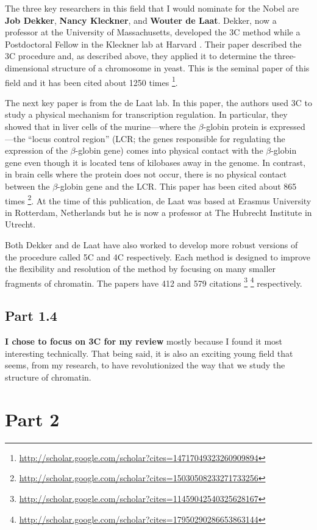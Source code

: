 \documentclass[12pt]{article}
\begin{document}
The three key researchers in this field that I would nominate for the Nobel
are {\bf Job Dekker}, {\bf Nancy Kleckner}, and {\bf Wouter de Laat}.
Dekker, now a professor at the University of Massachusetts, developed the 3C
method while a Postdoctoral Fellow in the Kleckner lab at Harvard \cite{ccc}.
Their paper \cite{ccc} described the 3C procedure and, as described above,
they applied it to determine the three-dimensional structure of a chromosome
in yeast.
This is the seminal paper of this field and it has been cited about 1250
times%
\footnote{\url{http://scholar.google.com/scholar?cites=14717049323260909894}}.

The next key paper \cite{looping} is from the de Laat lab.
In this paper, the authors used 3C to study a physical mechanism for
transcription regulation.
In particular, they showed that in liver cells of the murine---where the
$\beta$-globin protein is expressed---the ``locus control region'' (LCR; the
genes responsible for regulating the expression of the $\beta$-globin gene)
comes into physical contact with the $\beta$-globin gene even though it is
located tens of kilobases away in the genome.
In contrast, in brain cells where the protein does not occur, there is no
physical contact between the $\beta$-globin gene and the LCR.
This paper has been cited about 865 times%
\footnote{\url{http://scholar.google.com/scholar?cites=15030508233271733256}}.
At the time of this publication, de Laat was based at Erasmus University in
Rotterdam, Netherlands but he is now a professor at The Hubrecht Institute in
Utrecht.

Both Dekker \cite{5c} and de Laat \cite{4c} have also worked to develop more
robust versions of the procedure called 5C and 4C respectively.
Each method is designed to improve the flexibility and resolution of the
method by focusing on many smaller fragments of chromatin.
The papers have 412 and 579 citations%
\footnote{\url{http://scholar.google.com/scholar?cites=11459042540325628167}}%
\footnote{\url{http://scholar.google.com/scholar?cites=17950290286653863144}}
respectively.

\subsection*{Part 1.4}

{\bf I chose to focus on 3C for my review} mostly because I found it most
interesting technically.
That being said, it is also an exciting young field that seems, from my
research, to have revolutionized the way that we study the structure of
chromatin.


\section*{Part 2}



{}

\end{document}

